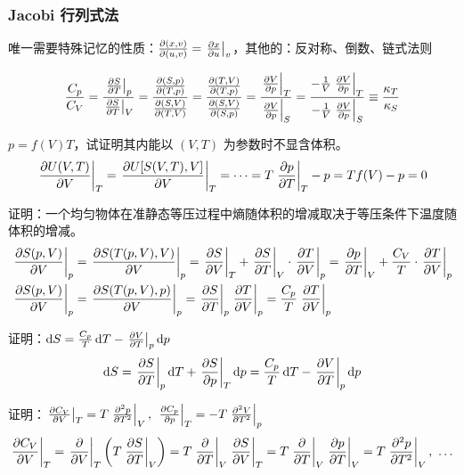 \subsubsection{Jacobi 行列式法}

唯一需要特殊记忆的性质：$\pdv{(x, v)}{(u, v)} = \left.\pdv{x}{u}\right|_v$，其他的：反对称、倒数、链式法则

\[
\frac{C_p}{C_V} = \frac{\left.\pdv{S}{T}\right|_p}{\left.\pdv{S}{T}\right|_V} = \frac{\pdv{(S, p)}{(T, p)}}{\pdv{(S, V)}{(T, V)}} = \frac{\pdv{(T, V)}{(T, p)}}{\pdv{(S, V)}{(S, p)}} = \frac{\left.\pdv{V}{p}\right|_T}{\left.\pdv{V}{p}\right|_S} = \frac{- \frac{1}{V} \left.\pdv{V}{p}\right|_T}{- \frac{1}{V} \left.\pdv{V}{p}\right|_S} \equiv \frac{\kappa_T}{\kappa_S}
\]

\begin{framed}
$p = f(V) T$，试证明其内能以 $(V, T)$ 为参数时不显含体积。
\[
\left.\pdv{U(V, T)}{V}\right|_T = \left.\pdv{U[S(V, T), V]}{V}\right|_T = \dots = T \left.\pdv{p}{T}\right|_T - p = T f(V) - p = 0
\]
\end{framed}

\begin{framed}
证明：一个均匀物体在准静态等压过程中熵随体积的增减取决于等压条件下温度随体积的增减。
\begin{align*}
    \left.\pdv{S(p, V)}{V}\right|_p & = \left.\pdv{S(T(p, V), V)}{V}\right|_p = \left.\pdv{S}{V}\right|_T + \left.\pdv{S}{T}\right|_V \cdot \left.\pdv{T}{V}\right|_p = \left.\pdv{p}{T}\right|_V + \frac{C_V}{T} \cdot \left.\pdv{T}{V}\right|_p\\
    \left.\pdv{S(p, V)}{V}\right|_p & = \left.\pdv{S(T(p, V), p)}{V}\right|_p = \left.\pdv{S}{T}\right|_p \left.\pdv{T}{V}\right|_p = \frac{C_p}{T} \left.\pdv{T}{V}\right|_p
\end{align*}
\end{framed}

\begin{framed}
证明：$\dd{S} = \frac{C_p}{T} \dd{T} - \left.\pdv{V}{T}\right|_p \dd{p}$
\[
\dd{S} = \left.\pdv{S}{T}\right|_p \dd{T} + \left.\pdv{S}{p}\right|_T \dd{p} = \frac{C_p}{T} \dd{T} - \left.\pdv{V}{T}\right|_p \dd{p}
\]
\end{framed}

\begin{framed}
证明：$\left.\pdv{C_V}{V}\right|_T = T \left.\pdv[2]{p}{T}\right|_V,\ \left.\pdv{C_p}{p}\right|_T = - T \left.\pdv[2]{V}{T}\right|_p$
\[
\left.\pdv{C_V}{V}\right|_T = \left.\pdv{}{V}\right|_T
\left(T\left.\pdv{S}{T}\right|_V\right) = T \left.\pdv{}{T}\right|_V \left.\pdv{S}{V}\right|_T = T \left.\pdv{}{T}\right|_V \left.\pdv{p}{T}\right|_V = T \left.\pdv[2]{p}{T}\right|_V,\ \dots
\]
\end{framed}


